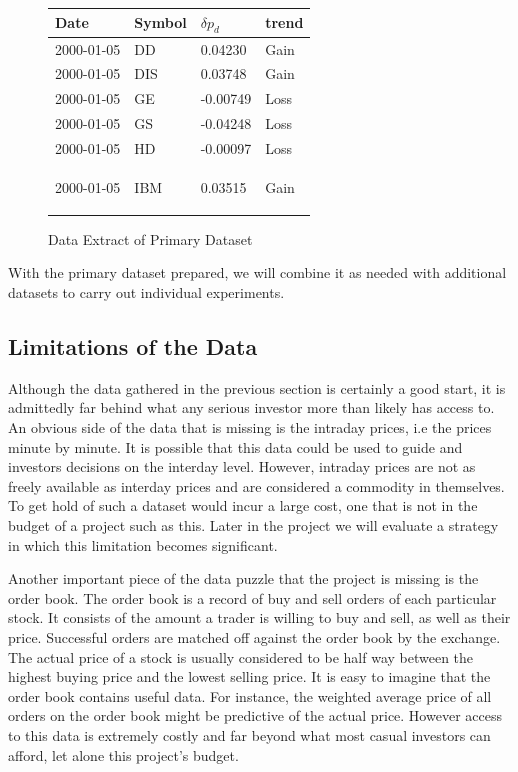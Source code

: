 \documentclass{report}
\begin{document}
\begin{figure}[H]
\caption{Data Extract of Primary Dataset}
\begin{center}
  
    \begin{tabular}{l | l | l | l }
      Date & Symbol & $\delta p_{d}$ & trend \\ \hline
      2000-01-05 & DD  &	0.04230 	& Gain \\ \hline
      2000-01-05 & DIS &	0.03748 	& Gain \\ \hline
      2000-01-05 & GE  &	-0.00749 	& Loss \\ \hline
      2000-01-05 & GS  &	-0.04248 	& Loss \\ \hline
      2000-01-05 & HD  &	-0.00097 	& Loss \\ \hline
      2000-01-05 & IBM &	0.03515 	& Gain

    \label{table:data-example-0}
    \end{tabular}
\end{center}
\end{figure}

With the primary dataset prepared, we will combine it as needed with additional datasets to carry out individual experiments. 

\subsection{Limitations of the Data}

Although the data gathered in the previous section is certainly a good start, it is admittedly far behind what any serious investor more than likely has access to. An obvious side of the data that is missing is the intraday prices, i.e the prices minute by minute. It is possible that this data could be used to guide and investors decisions on the interday level. However, intraday prices are not as freely available as interday prices and are considered a commodity in themselves. To get hold of such a dataset would incur a large cost, one that is not in the budget of a project such as this. Later in the project we will evaluate a strategy in which this limitation becomes significant.

Another important piece of the data puzzle that the project is missing is the order book. The order book is a record of buy and sell orders of each particular stock. It consists of the amount a trader is willing to buy and sell, as well as their price. Successful orders are matched off against the order book by the exchange. The actual price of a stock is usually considered to be half way between the highest buying price and the lowest selling price. It is easy to imagine that the order book contains useful data. For instance, the weighted average price of all orders on the order book might be predictive of the actual price. However access to this data is extremely costly and far beyond what most casual investors can afford, let alone this project's budget.
\end{document}
